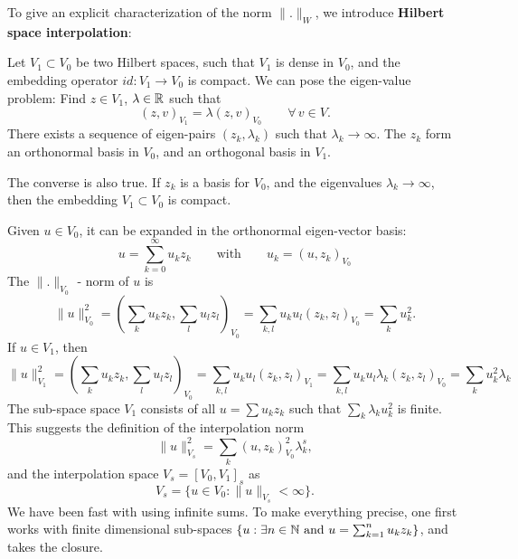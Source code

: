 \bigskip

To give an explicit characterization of the norm $\|.\|_W$, we introduce
{\bf Hilbert space interpolation}:

Let $V_1 \subset V_0$ be two Hilbert spaces, such that $V_1$ is dense 
in $V_0$, and the embedding operator $id : V_1 \rightarrow V_0$
is compact. We can pose the eigen-value problem: Find $z \in V_1$, $\lambda \in {\mathbb R}$ such that
$$
(z, v)_{V_1} = \lambda (z, v)_{V_0} \qquad \forall \, v \in V.
$$
There exists a sequence of eigen-pairs $(z_k, \lambda_k)$ such that $\lambda_k
\rightarrow \infty$. The $z_k$ form an orthonormal basis in $V_0$, and
an orthogonal basis in $V_1$. 

\bigskip

The converse is also true. If $z_k$ is a basis for $V_0$, and the eigenvalues
$\lambda_k \rightarrow \infty$, then the embedding $V_1 \subset V_0$ is compact.

\bigskip

Given $u \in V_0$, it can be expanded in the orthonormal eigen-vector basis:
$$
u = \sum_{k=0}^\infty u_k z_k \qquad \mbox{with} \qquad u_k = (u, z_k)_{V_0}
$$
The $\|.\|_{V_0}$ - norm of $u$ is 
$$
\| u \|_{V_0}^2 = (\sum_k u_k z_k, \sum_l u_l z_l)_{V_0} = 
        \sum_{k,l} u_k u_l (z_k,z_l)_{V_0} = \sum_k u_k^2.
$$
If $u \in V_1$, then 
$$
\| u \|_{V_1}^2 = (\sum_k u_k z_k, \sum_l u_l z_l)_{V_0} = 
        \sum_{k,l} u_k u_l (z_k,z_l)_{V_1} = 
        \sum_{k,l} u_k u_l \lambda_k (z_k,z_l)_{V_0} = 
        \sum_k u_k^2 \lambda_k
$$
The sub-space space $V_1$ consists of all $u = \sum u_k z_k$ such 
that $\sum_k \lambda_k u_k^2$ is finite. This suggests the definition
of the interpolation norm
$$
\| u \|_{V_s}^2 = \sum_k (u, z_k)_{V_0}^2 \lambda_k^s,
$$
and the interpolation space $V_s = [V_0, V_1]_s$ as
$$
V_s = \{ u \in V_0 : \| u \|_{V_s} < \infty \}.
$$
We have been fast with using infinite sums. To make everything precise,
one first works with finite dimensional sub-spaces $\{ u : \exists n \in {\mathbb N} \mbox{ and } u = \sum_{k=1}^n u_k z_k \}$, and takes the closure.


\bigskip

